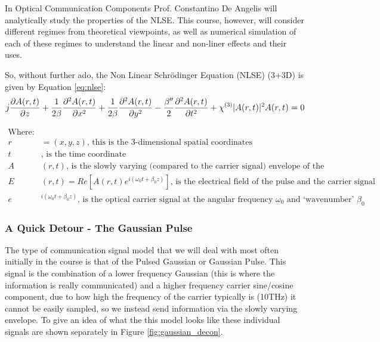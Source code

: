 \documentclass[colorlinks,11pt,a4paper,normalphoto,withhyper,ragged2e]{altareport}
\begin{document}
	In Optical Communication Components Prof. Constantino De Angelis will analytically study the properties of the NLSE. This course, however, will consider different regimes from theoretical viewpoints, as well as numerical simulation of each of these regimes to understand the linear and non-liner effects and their uses. \linebreak
	
	So, without further ado, the Non Linear Schr\"{o}dinger Equation (NLSE) (3+3D) is given by Equation \ref{eq:nlse}:
	\begin{equation} \label{eq:nlse}
       \mathlarger{ j \frac{\partial A(r,t)}{\partial z} + \frac{1}{2 \beta} \frac{\partial^2 A(r,t)}{\partial x^2} + \frac{1}{2 \beta} \frac{\partial^2 A(r,t)}{\partial y^2} - \frac{ \beta ''}{2} \frac{\partial^2 A(r,t)}{\partial t^2} + \chi^{(3)} |A(r,t)|^2 A(r,t) = 0 }
	\end{equation}
	
	\begin{align*}
		\text{Where:}& \\
		r & = (x, y, z) \text{, this is the 3-dimensional spatial coordinates} \\
		t & \text{, is the time coordinate} \\
		A & (r,t) \text{, is the slowly varying (compared to the carrier signal) envelope of the signal} \\
		E & (r,t) = Re[A(r,t) e^{i(\omega_0t + \beta_0z)}] \text{, is the electrical field of the pulse and the carrier signal} \\
		e&^{{i(\omega_0t + \beta_0z)}} \text{, is the optical carrier signal at the angular frequency } \omega_0 \text{ and `wavenumber' } \beta_0 
	\end{align*}
	
	
	\pagebreak
	
	
	\subsubsection{A Quick Detour - The Gaussian Pulse} \label{sec:detour_gaussian}
	The type of communication signal model that we will deal with most often initially in the course is that of the Pulsed Gaussian or Gaussian Pulse. This signal is the combination of a lower frequency Gaussian (this is where the information is really communicated) and a higher frequency carrier sine/cosine component, due to how high the frequency of the carrier typically is (10THz) it cannot be easily sampled, so we instead send information via the slowly varying envelope. To give an idea of what the this model looks like these individual signals are shown separately in Figure \ref{fig:gaussian_decon}. \linebreak
	
\end{document}
